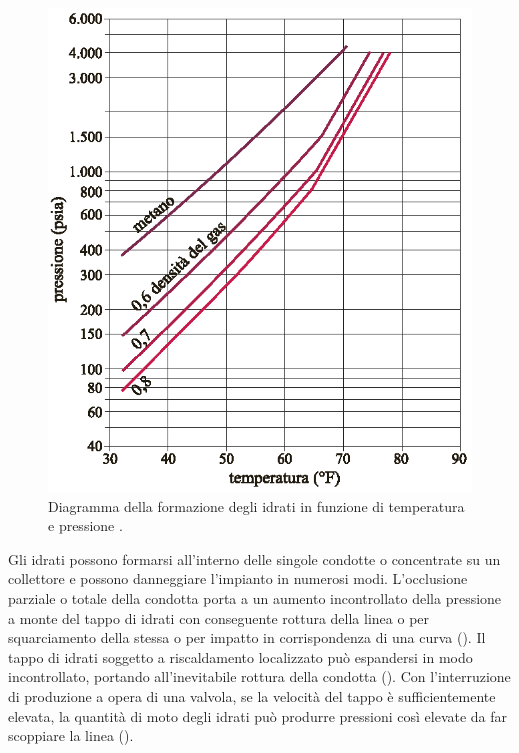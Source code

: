\begin{figure}[htbp]
    \centering
    \includegraphics[width=.5\textwidth]{fig/impianti/formazioneidrati.eps}
    \caption{Diagramma della formazione degli idrati in funzione di temperatura e pressione \parencite{bianco2005impiantigas}.}
    \label{fig:formazioneidrati}
\end{figure}
Gli idrati possono formarsi all'interno delle singole condotte o concentrate su un collettore e possono danneggiare l'impianto in numerosi modi. L'occlusione parziale o totale della condotta porta a un aumento incontrollato della pressione a monte del tappo di idrati con conseguente rottura della linea o per squarciamento della stessa o per impatto in corrispondenza di una curva (). Il tappo di idrati soggetto a riscaldamento localizzato può espandersi in modo incontrollato, portando all'inevitabile rottura della condotta (). Con l'interruzione di produzione a opera di una valvola, se la velocità del tappo è sufficientemente elevata, la quantità di moto degli idrati può produrre pressioni così elevate da far scoppiare la linea ().

